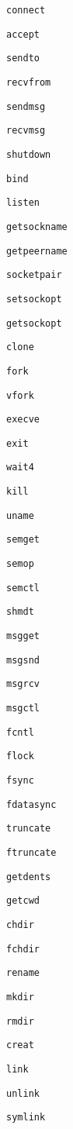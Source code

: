 \verb+connect+

\verb+accept+

\verb+sendto+

\verb+recvfrom+

\verb+sendmsg+

\verb+recvmsg+

\verb+shutdown+

\verb+bind+

\verb+listen+

\verb+getsockname+

\verb+getpeername+

\verb+socketpair+

\verb+setsockopt+

\verb+getsockopt+

\verb+clone+

\verb+fork+

\verb+vfork+

\verb+execve+

\verb+exit+

\verb+wait4+

\verb+kill+

\verb+uname+

\verb+semget+

\verb+semop+

\verb+semctl+

\verb+shmdt+

\verb+msgget+

\verb+msgsnd+

\verb+msgrcv+

\verb+msgctl+

\verb+fcntl+

\verb+flock+

\verb+fsync+

\verb+fdatasync+

\verb+truncate+

\verb+ftruncate+

\verb+getdents+

\verb+getcwd+

\verb+chdir+

\verb+fchdir+

\verb+rename+

\verb+mkdir+

\verb+rmdir+

\verb+creat+

\verb+link+

\verb+unlink+

\verb+symlink+

